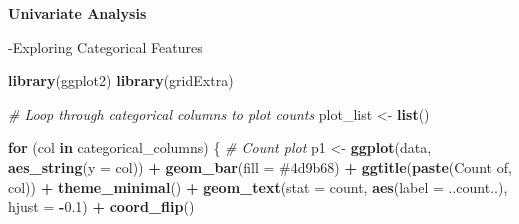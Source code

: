 \documentclass[
]{article}
\newenvironment{Shaded}{\begin{snugshade}}{\end{snugshade}}
\newcommand{\AttributeTok}[1]{\textcolor[rgb]{0.13,0.29,0.53}{#1}}
\newcommand{\CommentTok}[1]{\textcolor[rgb]{0.56,0.35,0.01}{\textit{#1}}}
\newcommand{\ControlFlowTok}[1]{\textcolor[rgb]{0.13,0.29,0.53}{\textbf{#1}}}
\newcommand{\FloatTok}[1]{\textcolor[rgb]{0.00,0.00,0.81}{#1}}
\newcommand{\FunctionTok}[1]{\textcolor[rgb]{0.13,0.29,0.53}{\textbf{#1}}}
\newcommand{\NormalTok}[1]{#1}
\newcommand{\OtherTok}[1]{\textcolor[rgb]{0.56,0.35,0.01}{#1}}
\newcommand{\SpecialCharTok}[1]{\textcolor[rgb]{0.81,0.36,0.00}{\textbf{#1}}}
\newcommand{\StringTok}[1]{\textcolor[rgb]{0.31,0.60,0.02}{#1}}
\begin{document}
\textbf{Univariate Analysis}

-Exploring Categorical Features

\begin{Shaded}
\begin{Highlighting}[]
\FunctionTok{library}\NormalTok{(ggplot2)}
\FunctionTok{library}\NormalTok{(gridExtra)}

\CommentTok{\# Loop through categorical columns to plot counts}
\NormalTok{plot\_list }\OtherTok{\textless{}{-}} \FunctionTok{list}\NormalTok{()}

\ControlFlowTok{for}\NormalTok{ (col }\ControlFlowTok{in}\NormalTok{ categorical\_columns) \{}
  \CommentTok{\# Count plot}
\NormalTok{  p1 }\OtherTok{\textless{}{-}} \FunctionTok{ggplot}\NormalTok{(data, }\FunctionTok{aes\_string}\NormalTok{(}\AttributeTok{y =}\NormalTok{ col)) }\SpecialCharTok{+}
    \FunctionTok{geom\_bar}\NormalTok{(}\AttributeTok{fill =} \StringTok{\textquotesingle{}\#4d9b68\textquotesingle{}}\NormalTok{) }\SpecialCharTok{+}
    \FunctionTok{ggtitle}\NormalTok{(}\FunctionTok{paste}\NormalTok{(}\StringTok{\textquotesingle{}Count of\textquotesingle{}}\NormalTok{, col)) }\SpecialCharTok{+}
    \FunctionTok{theme\_minimal}\NormalTok{() }\SpecialCharTok{+}
    \FunctionTok{geom\_text}\NormalTok{(}\AttributeTok{stat =} \StringTok{\textquotesingle{}count\textquotesingle{}}\NormalTok{, }\FunctionTok{aes}\NormalTok{(}\AttributeTok{label =}\NormalTok{ ..count..), }\AttributeTok{hjust =} \SpecialCharTok{{-}}\FloatTok{0.1}\NormalTok{) }\SpecialCharTok{+}
    \FunctionTok{coord\_flip}\NormalTok{()}
  

\end{Highlighting}
\end{Shaded}
\end{document}
